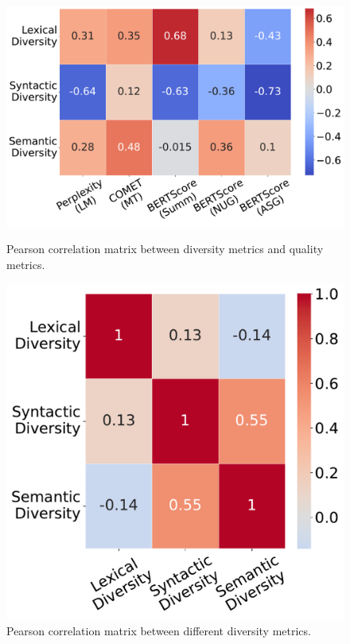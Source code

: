 \documentclass[11pt,a4paper]{article}
\begin{document}
\begin{figure}[ht]
\begin{minipage}{0.55\linewidth}\centering
\includegraphics[height=9.3\baselineskip]{figures/correlation_qual_div.pdf}
\caption{Pearson correlation matrix between diversity metrics and quality metrics.}
\label{fig:correlation_qual_div}
\end{minipage}\hfill
\begin{minipage}{0.4\linewidth}\centering
\includegraphics[height=9.3\baselineskip]{figures/correlation_div.pdf}
\caption{Pearson correlation matrix between different diversity metrics.}
\label{fig:correlation_div}
\end{minipage}
\end{figure}
\end{document}
